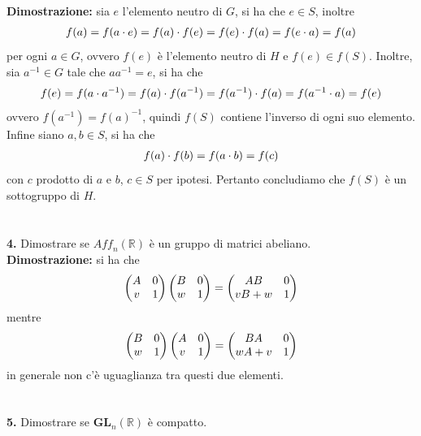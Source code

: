 \documentclass{article}
\begin{document}
\textbf{Dimostrazione:} sia $e$ l'elemento neutro di $G$, si ha che $e \in S$, inoltre
\begin{gather}
    f(a) = f(a \cdot e) = f(a) \cdot f(e) = f(e) \cdot f(a) = f(e \cdot a) = f(a) \notag
\end{gather}
per ogni $a \in G$, ovvero $f(e)$ è l'elemento neutro di $H$ e $f(e) \in f(S)$. Inoltre, sia $a^{-1} \in G$ tale che $aa^{-1} = e$, si ha che
\begin{gather}
    f(e) = f(a \cdot a^{-1}) = f(a) \cdot f(a^{-1}) = f(a^{-1}) \cdot f(a) = f(a^{-1} \cdot a) = f(e) \notag
\end{gather}
ovvero $f(a^{-1}) = f(a)^{-1}$, quindi $f(S)$ contiene l'inverso di ogni suo elemento. Infine siano $a, b \in S$, si ha che
\begin{gather}
    f(a) \cdot f(b) = f(a \cdot b) = f(c) \notag
\end{gather}
con $c$ prodotto di $a$ e $b$, $c \in S$ per ipotesi. Pertanto concludiamo che $f(S)$ è un sottogruppo di $H$. \\ \\ \\
\textbf{4.} Dimostrare se $\textit{Aff}_n(\mathbb{R})$ è un gruppo di matrici abeliano. \\

\textbf{Dimostrazione:} si ha che
\begin{gather}
    \begin{pmatrix}
        A & 0 \\
        v & 1
    \end{pmatrix}
    \begin{pmatrix}
        B & 0 \\
        w & 1
    \end{pmatrix} = 
    \begin{pmatrix}
        AB & 0 \\
        vB + w & 1
    \end{pmatrix} \notag
\end{gather}
mentre
\begin{gather}
    \begin{pmatrix}
        B & 0 \\
        w & 1
    \end{pmatrix}
    \begin{pmatrix}
        A & 0 \\
        v & 1
    \end{pmatrix} = 
    \begin{pmatrix}
        BA & 0 \\
        wA + v & 1
    \end{pmatrix} \notag
\end{gather}
in generale non c'è uguaglianza tra questi due elementi. \\ \\ \\
\textbf{5.} Dimostrare se $\mathbf{GL}_n(\mathbb{R})$ è compatto. \\
\end{document}
